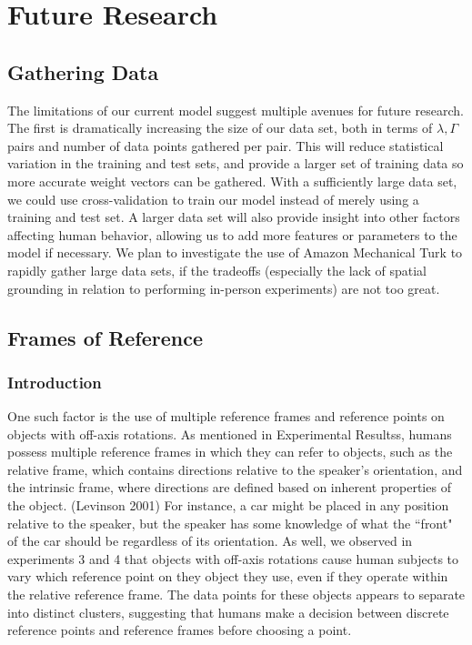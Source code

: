 \documentclass[12pt,letterpaper]{article}
\begin{document}
\section{Future Research}

\subsection{Gathering Data}

The limitations of our current model suggest multiple avenues for future research. The first is dramatically increasing the size of our data set, both in terms of $\lambda, \Gamma$ pairs and number of data points gathered per pair. This will reduce statistical variation in the training and test sets, and provide a larger set of training data so more accurate weight vectors can be gathered. With a sufficiently large data set, we could use cross-validation to train our model instead of merely using a training and test set. A larger data set will also provide insight into other factors affecting human behavior, allowing us to add more features or parameters to the model if necessary. We plan to investigate the use of Amazon Mechanical Turk to rapidly gather large data sets, if the tradeoffs (especially the lack of spatial grounding in relation to performing in-person experiments) are not too great. 

\subsection{Frames of Reference}

\subsubsection{Introduction}

One such factor is the use of multiple reference frames and reference points on objects with off-axis rotations. As mentioned in Experimental Resultss, humans possess multiple reference frames in which they can refer to objects, such as the relative frame, which contains directions relative to the speaker's orientation, and the intrinsic frame, where directions are defined based on inherent properties of the object. (Levinson 2001) For instance, a car might be placed in any position relative to the speaker, but the speaker has some knowledge of what the ``front" of the car should be regardless of its orientation. As well, we observed in experiments 3 and 4 that objects with off-axis rotations cause human subjects to vary which reference point on they object they use, even if they operate within the relative reference frame. The data points for these objects appears to separate into distinct clusters, suggesting that humans make a decision between discrete reference points and reference frames before choosing a point. 
\end{document}
